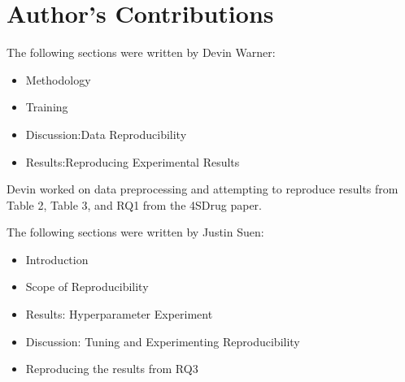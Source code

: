 \documentclass[letterpaper]{article} %
\begin{document}
\section{Author's Contributions}
The following sections were written by Devin Warner:
\begin{itemize}
    \item Methodology
    \item Training
    \item Discussion:Data Reproducibility
    \item Results:Reproducing Experimental Results
\end{itemize}

Devin worked on data preprocessing and attempting to reproduce results from Table 2, Table 3, and RQ1 from the 4SDrug paper. 

\bigskip

The following sections were written by Justin Suen:
\begin{itemize}
    \item Introduction
    \item Scope of Reproducibility
    \item Results: Hyperparameter Experiment
    \item Discussion: Tuning and Experimenting Reproducibility
    \item Reproducing the results from RQ3
\end{itemize}


\newpage

\end{document}
